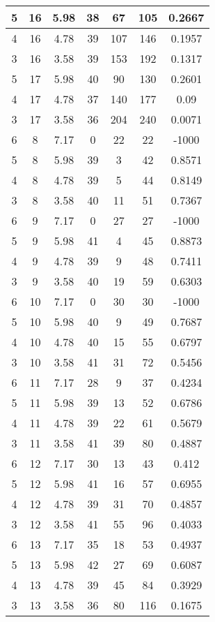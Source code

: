 \documentclass[letterpaper, 12pt]{article}
\begin{document}
\begin{longtable}{|c|c|c|c|c|c|c|}
\hline
5 & 16 & 5.98 & 38 & 67 & 105 & 0.2667 \\
\hline
4 & 16 & 4.78 & 39 & 107 & 146 & 0.1957 \\
\hline
3 & 16 & 3.58 & 39 & 153 & 192 & 0.1317 \\
\hline
5 & 17 & 5.98 & 40 & 90 & 130 & 0.2601 \\
\hline
4 & 17 & 4.78 & 37 & 140 & 177 & 0.09 \\
\hline
3 & 17 & 3.58 & 36 & 204 & 240 & 0.0071 \\
\hline
6 & 8 & 7.17 & 0 & 22 & 22 & -1000 \\
\hline
5 & 8 & 5.98 & 39 & 3 & 42 & 0.8571 \\
\hline
4 & 8 & 4.78 & 39 & 5 & 44 & 0.8149 \\
\hline
3 & 8 & 3.58 & 40 & 11 & 51 & 0.7367 \\
\hline
6 & 9 & 7.17 & 0 & 27 & 27 & -1000 \\
\hline
5 & 9 & 5.98 & 41 & 4 & 45 & 0.8873 \\
\hline
4 & 9 & 4.78 & 39 & 9 & 48 & 0.7411 \\
\hline
3 & 9 & 3.58 & 40 & 19 & 59 & 0.6303 \\
\hline
6 & 10 & 7.17 & 0 & 30 & 30 & -1000 \\
\hline
5 & 10 & 5.98 & 40 & 9 & 49 & 0.7687 \\
\hline
4 & 10 & 4.78 & 40 & 15 & 55 & 0.6797 \\
\hline
3 & 10 & 3.58 & 41 & 31 & 72 & 0.5456 \\
\hline
6 & 11 & 7.17 & 28 & 9 & 37 & 0.4234 \\
\hline
5 & 11 & 5.98 & 39 & 13 & 52 & 0.6786 \\
\hline
4 & 11 & 4.78 & 39 & 22 & 61 & 0.5679 \\
\hline
3 & 11 & 3.58 & 41 & 39 & 80 & 0.4887 \\
\hline
6 & 12 & 7.17 & 30 & 13 & 43 & 0.412 \\
\hline
5 & 12 & 5.98 & 41 & 16 & 57 & 0.6955 \\
\hline
4 & 12 & 4.78 & 39 & 31 & 70 & 0.4857 \\
\hline
3 & 12 & 3.58 & 41 & 55 & 96 & 0.4033 \\
\hline
6 & 13 & 7.17 & 35 & 18 & 53 & 0.4937 \\
\hline
5 & 13 & 5.98 & 42 & 27 & 69 & 0.6087 \\
\hline
4 & 13 & 4.78 & 39 & 45 & 84 & 0.3929 \\
\hline
3 & 13 & 3.58 & 36 & 80 & 116 & 0.1675 \\

\end{longtable}
\end{document}

